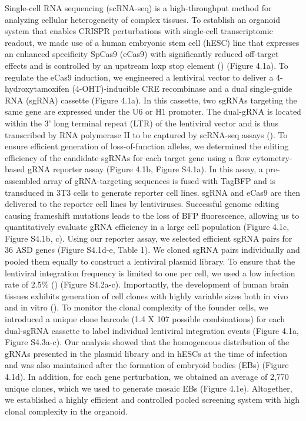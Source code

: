Single-cell RNA sequencing (scRNA-seq) is a high-throughput method for analyzing cellular heterogeneity of complex tissues. To establish an organoid system that enables CRISPR perturbations with single-cell transcriptomic readout, we made use of a human embryonic stem cell (hESC) line that expresses an enhanced specificity SpCas9 (eCas9) with significantly reduced off-target effects and is controlled by an upstream loxp stop element (\cite{esk_human_2020}) (Figure 4.1a). To regulate the eCas9 induction, we engineered a lentiviral vector to deliver a 4-hydroxytamoxifen (4-OHT)-inducible CRE recombinase and a dual single-guide RNA (sgRNA) cassette (Figure 4.1a). In this cassette, two sgRNAs targeting the same gene are expressed under the U6 or H1 promoter. The dual-gRNA is located within the 3' long terminal repeat (LTR) of the lentiviral vector and is thus transcribed by RNA polymerase II to be captured by scRNA-seq assays (\cite{datlinger_pooled_2017}). To ensure efficient generation of loss-of-function alleles, we determined the editing efficiency of the candidate sgRNAs for each target gene using a flow cytometry-based gRNA reporter assay (Figure  4.1b, Figure S4.1a). In this assay, a pre-assembled array of gRNA-targeting sequences is fused with TagBFP and is transduced in 3T3 cells to generate reporter cell lines. sgRNA and eCas9 are then delivered to the reporter cell lines by lentiviruses. Successful genome editing causing frameshift mutations leads to the loss of BFP fluorescence, allowing us to quantitatively evaluate gRNA efficiency in a large cell population (Figure  4.1c, Figure S4.1b, c). Using our reporter assay, we selected efficient sgRNA pairs for 36 ASD genes (Figure S4.1d-e, Table 1).  
We cloned sgRNA pairs individually and pooled them equally to construct a lentiviral plasmid library. To ensure that the lentiviral integration frequency is limited to one per cell, we used a low infection rate of 2.5\% (\cite{doench_am_2018}) (Figure S4.2a-c). Importantly, the development of human brain tissues exhibits generation of cell clones with highly variable sizes both in vivo and in vitro (\cite{esk_human_2020,bizzotto_landmarks_2021}). To monitor the clonal complexity of the founder cells, we introduced a unique clone barcode (1.4 X 107 possible combinations) for each dual-sgRNA cassette to label individual lentiviral integration events (Figure 4.1a, Figure S4.3a-c). Our analysis showed that the homogeneous distribution of the gRNAs presented in the plasmid library and in hESCs at the time of infection and was also maintained after the formation of embryoid bodies (EBs) (Figure 4.1d). In addition, for each gene perturbation, we obtained an average of 2,770 unique clones, which we used to generate mosaic EBs (Figure 4.1e). Altogether, we established a highly efficient and controlled pooled screening system with high clonal complexity in the organoid. 

